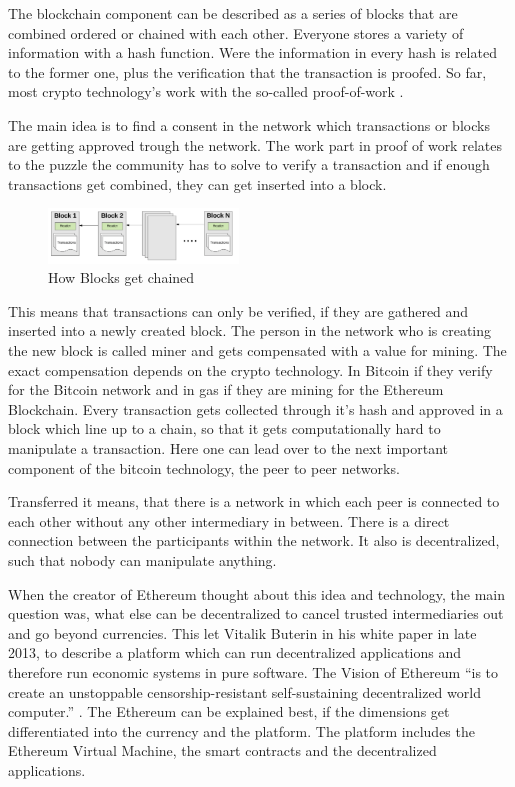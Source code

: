 The blockchain component can be described as a series of blocks that are combined ordered or chained with each other. 
Everyone stores a variety of information with a hash function.
Were the information in every hash is related to the former one, plus the verification that the transaction is proofed. 
So far, most crypto technology’s work with the so-called proof-of-work \cite{Ray2018}.

The main idea is to find a consent in the network which transactions or blocks are getting approved trough the network. The work part in proof of work relates to the puzzle the community has to solve to verify a transaction and if enough transactions get combined, they can get inserted into a block.

\begin{figure}[ht]
\centering
\caption{How Blocks get chained} 
\includegraphics[width=0.45\textwidth]{blockchain}
\end{figure}

This means that transactions can only be verified, if they are gathered and inserted into a newly created block. The person in the network who is creating the new block is called miner and gets compensated with a value for mining. 
The exact compensation depends on the crypto technology. 
In Bitcoin if they verify for the Bitcoin network and in gas if they are mining for the Ethereum Blockchain. 
Every transaction gets collected through it's hash and approved in a block which line up to a chain, so that it gets computationally hard to manipulate a transaction. 
Here one can lead over to the next important component of the bitcoin technology, the peer to peer networks. 

Transferred it means, that there is a network in which each peer is connected to each other without any other intermediary in between.
There is a direct connection between the participants within the network. 
It also is decentralized, such that nobody can manipulate anything.

When the creator of Ethereum thought about this idea and technology, the main question was, what else can be decentralized to cancel trusted intermediaries out and go beyond currencies.
This let Vitalik Buterin in his white paper in late 2013, to describe a platform which can run decentralized applications and therefore run economic systems in pure software. 
The Vision of Ethereum “is to create an unstoppable censorship-resistant self-sustaining decentralized world computer.” \cite{Ray2018a}.
The Ethereum can be explained best, if the dimensions get differentiated into the currency and the platform. 
The platform includes the Ethereum Virtual Machine, the smart contracts and the decentralized applications. 

